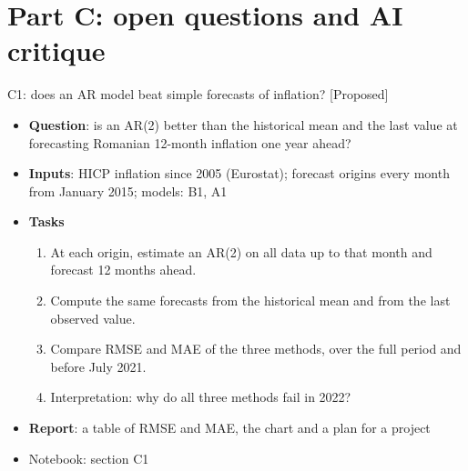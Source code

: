 \section{Part C: open questions and AI critique}

\begin{frame}{C1: does an AR model beat simple forecasts of inflation? [Proposed]}
\itemsize{\footnotesize}
\begin{itemize}
\item \textbf{Question}: is an AR(2) better than the historical mean and the last value at forecasting Romanian 12-month inflation one year ahead?
\item \textbf{Inputs}: HICP inflation since 2005 (Eurostat); forecast origins every month from January 2015; models: B1, A1
\item \textbf{Tasks}
\begin{enumerate}
    \item At each origin, estimate an AR(2) on all data up to that month and forecast 12 months ahead.
    \item Compute the same forecasts from the historical mean and from the last observed value.
    \item Compare RMSE and MAE of the three methods, over the full period and before July 2021.
    \item Interpretation: why do all three methods fail in 2022?
\end{enumerate}
\item \textbf{Report}: a table of RMSE and MAE, the chart and a plan for a project
\item Notebook: section C1
\end{itemize}
\end{frame}

